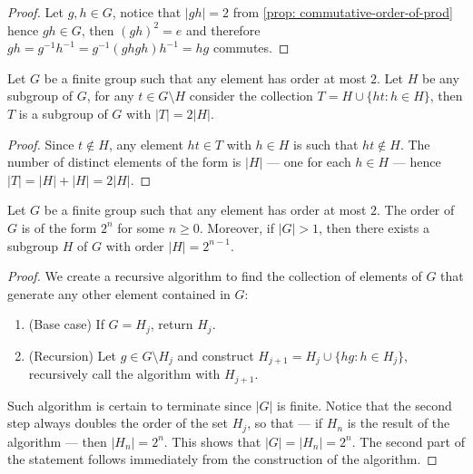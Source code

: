 \begin{proof}
    Let \(g, h \in G\), notice that \(|gh| = 2\) from \cref{prop:
        commutative-order-of-prod} hence \(gh \in G\), then \((gh)^2 = e\) and
    therefore \(gh = g^{-1} h^{-1} = g^{-1}(ghgh)h^{-1} = hg\) commutes.
\end{proof}

\begin{lemma}
    Let \(G\) be a finite group such that any element has order at most \(2\). Let
    \(H\) be any subgroup of \(G\), for any \(t \in G \setminus H\) consider the
    collection \(T = H \cup \{h t \colon h \in H\}\), then \(T\) is a subgroup of \(G\)
    with \(|T| = 2|H|\).
\end{lemma}

\begin{proof}
    Since \(t \not\in H\), any element \(ht \in T\) with \(h \in H\) is such that
    \(ht \not\in H\). The number of distinct elements of the form is \(|H|\) ---
    one for each \(h \in H\) --- hence \(|T| = |H| + |H| = 2|H|\).
\end{proof}

\begin{lemma}[Order \(2^n\)]\label{lem: order-2n}
    Let \(G\) be a finite group such that any element has order at most \(2\). The
    order of \(G\) is of the form \(2^n\) for some \(n \geq 0\). Moreover, if
    \(|G| > 1\), then there exists a subgroup \(H\) of \(G\) with order \(|H| =
    2^{n-1}\).
\end{lemma}

\begin{proof}
    We create a recursive algorithm to find the collection of elements of \(G\)
    that generate any other element contained in \(G\):
    \begin{enumerate}
        \item (Base case) If \(G = H_j\), return \(H_j\).
        \item (Recursion) Let \(g \in G \setminus H_j\) and construct \(H_{j + 1} =
              H_j \cup \{h g \colon h \in H_j\}\), recursively call the algorithm with \(H_{j
                      + 1}\).
    \end{enumerate}
    Such algorithm is certain to terminate since \(|G|\) is finite. Notice that
    the second step always doubles the order of the set \(H_j\), so that --- if
    \(H_n\) is the result of the algorithm --- then \(|H_n| = 2^n\). This shows
    that \(|G| = |H_n| = 2^n\). The second part of the statement follows
    immediately from the construction of the algorithm.
\end{proof}

